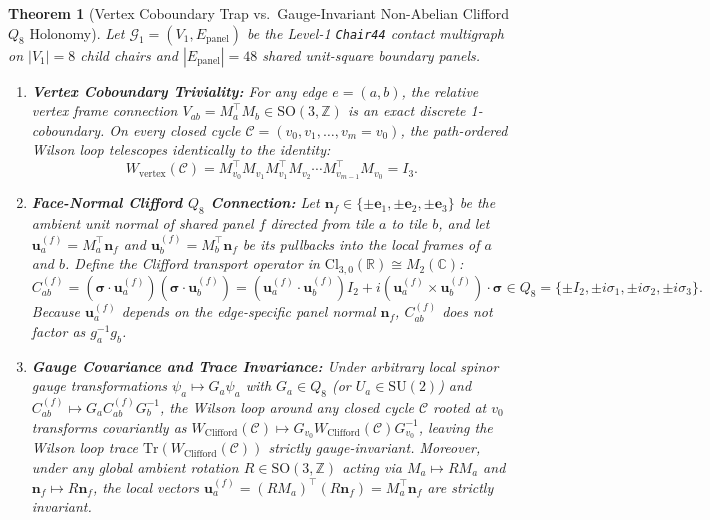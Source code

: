 \documentclass[11pt,a4paper]{article}
\newtheorem{theorem}{Theorem}[section]
\theoremstyle{definition}
\begin{document}
\begin{theorem}[Vertex Coboundary Trap vs.\ Gauge-Invariant Non-Abelian Clifford $Q_8$ Holonomy]
\label{thm:clifford_holonomy}
Let $\mathcal{G}_1 = (V_1, E_{\mathrm{panel}})$ be the Level-1 \texttt{Chair44} contact multigraph on $|V_1|=8$ child chairs and $|E_{\mathrm{panel}}|=48$ shared unit-square boundary panels.
\begin{enumerate}
    \item \textbf{Vertex Coboundary Triviality:} For any edge $e=(a,b)$, the relative vertex frame connection $V_{ab} = M_a^\top M_b \in \mathrm{SO}(3,\mathbb{Z})$ is an exact discrete 1-coboundary. On every closed cycle $\mathcal{C} = (v_0, v_1, \dots, v_m = v_0)$, the path-ordered Wilson loop telescopes identically to the identity:
    \begin{equation}
    W_{\mathrm{vertex}}(\mathcal{C}) = M_{v_0}^\top M_{v_1} M_{v_1}^\top M_{v_2} \cdots M_{v_{m-1}}^\top M_{v_0} = I_3.
    \end{equation}
    \item \textbf{Face-Normal Clifford $Q_8$ Connection:} Let $\mathbf{n}_f \in \{\pm\mathbf{e}_1, \pm\mathbf{e}_2, \pm\mathbf{e}_3\}$ be the ambient unit normal of shared panel $f$ directed from tile $a$ to tile $b$, and let $\mathbf{u}_a^{(f)} = M_a^\top \mathbf{n}_f$ and $\mathbf{u}_b^{(f)} = M_b^\top \mathbf{n}_f$ be its pullbacks into the local frames of $a$ and $b$. Define the Clifford transport operator in $\mathrm{Cl}_{3,0}(\mathbb{R}) \cong M_2(\mathbb{C})$:
    \begin{equation}
    C_{ab}^{(f)} = (\boldsymbol{\sigma}\cdot \mathbf{u}_a^{(f)})(\boldsymbol{\sigma}\cdot \mathbf{u}_b^{(f)}) = (\mathbf{u}_a^{(f)}\cdot \mathbf{u}_b^{(f)}) I_2 + i (\mathbf{u}_a^{(f)} \times \mathbf{u}_b^{(f)})\cdot \boldsymbol{\sigma} \in Q_8 = \{\pm I_2, \pm i\sigma_1, \pm i\sigma_2, \pm i\sigma_3\}.
    \end{equation}
    Because $\mathbf{u}_a^{(f)}$ depends on the edge-specific panel normal $\mathbf{n}_f$, $C_{ab}^{(f)}$ does not factor as $g_a^{-1} g_b$.
    \item \textbf{Gauge Covariance and Trace Invariance:} Under arbitrary local spinor gauge transformations $\psi_a \mapsto G_a \psi_a$ with $G_a \in Q_8$ (or $U_a \in \mathrm{SU}(2)$) and $C_{ab}^{(f)} \mapsto G_a C_{ab}^{(f)} G_b^{-1}$, the Wilson loop around any closed cycle $\mathcal{C}$ rooted at $v_0$ transforms covariantly as $W_{\mathrm{Clifford}}(\mathcal{C}) \mapsto G_{v_0} W_{\mathrm{Clifford}}(\mathcal{C}) G_{v_0}^{-1}$, leaving the Wilson loop trace $\mathrm{Tr}(W_{\mathrm{Clifford}}(\mathcal{C}))$ strictly gauge-invariant. Moreover, under any global ambient rotation $R \in \mathrm{SO}(3,\mathbb{Z})$ acting via $M_a \mapsto R M_a$ and $\mathbf{n}_f \mapsto R\mathbf{n}_f$, the local vectors $\mathbf{u}_a^{(f)} = (R M_a)^\top (R\mathbf{n}_f) = M_a^\top \mathbf{n}_f$ are strictly invariant.

\end{enumerate}
\end{theorem}
\end{document}
